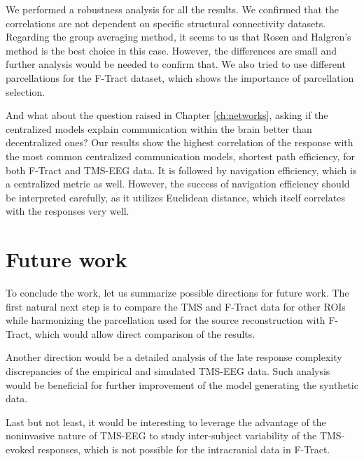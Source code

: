 We performed a robustness analysis for all the results. We confirmed that the correlations are not dependent on specific structural connectivity datasets. Regarding the group averaging method, it seems to us that Rosen and Halgren's method is the best choice in this case. However, the differences are small and further analysis would be needed to confirm that. We also tried to use different parcellations for the F-Tract dataset, which shows the importance of parcellation selection.

And what about the question raised in Chapter \ref{ch:networks}, asking if the centralized models explain communication within the brain better than decentralized ones? Our results show the highest correlation of the response with the most common centralized communication models, shortest path efficiency, for both F-Tract and TMS-EEG data. It is followed by navigation efficiency, which is a centralized metric as well. However, the success of navigation efficiency should be interpreted carefully, as it utilizes Euclidean distance, which itself correlates with the responses very well.

\section*{Future work}

To conclude the work, let us summarize possible directions for future work. The first natural next step is to compare the TMS and F-Tract data for other ROIs while harmonizing the parcellation used for the source reconstruction with F-Tract, which would allow direct comparison of the results.

Another direction would be a detailed analysis of the late response complexity discrepancies of the empirical and simulated TMS-EEG data. Such analysis would be beneficial for further improvement of the model generating the synthetic data.

Last but not least, it would be interesting to leverage the advantage of the noninvasive nature of TMS-EEG to study inter-subject variability of the TMS-evoked responses, which is not possible for the intracranial data in F-Tract.